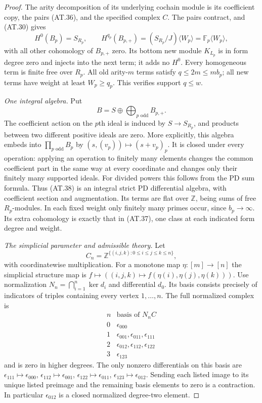 \begin{proof}
The arity decomposition of its underlying cochain
module is its coefficient copy, the pairs
\textup{(AT.36)}, and the specified complex $C$.
The pairs contract, and \textup{(AT.30)} gives
\[
 H^0(B_p)=S_{R_p},\qquad
 H^{q_p}(B_{p,+})=(S_{R_p}/J)\langle W_p\rangle
                   =\mathbb F_p\langle W_p\rangle,
 \tag{AT.37}
\]
with all other cohomology of $B_{p,+}$ zero.
Its bottom new module $K_{L_p}$ is in form degree zero
and injects into the next term; it adds no $H^0$.
Every homogeneous term is finite free over $R_p$.
All old arity-$m$ terms satisfy $q\leq2m\leq m b_p$;
all new terms have weight at least $W_p\geq q_p$.
This verifies support $q\leq w$.

\emph{One integral algebra.}
Put
\[
 B=S\oplus\bigoplus_{p\text{ odd}}B_{p,+}.
 \tag{AT.38}
\]
The coefficient action on the $p$th ideal is induced
by $S\to S_{R_p}$, and products between two different
positive ideals are zero.  More explicitly, this
algebra embeds into $\prod_{p\text{ odd}}B_p$ by
$(s,(v_p))\mapsto(s+v_p)_p$.
It is closed under every operation: applying an
operation to finitely many elements changes the common
coefficient part in the same way at every coordinate
and changes only their finitely many supported ideals.
For divided powers this follows from the PD sum formula.
Thus \textup{(AT.38)} is an integral strict PD differential
algebra, with coefficient section and augmentation.
Its terms are flat over $\mathbb Z$, being sums of
free $R_p$-modules.  In each fixed weight only finitely
many primes occur, since $b_p\to\infty$.
Its extra cohomology is exactly that in
\textup{(AT.37)}, one class at each indicated
form degree and weight.

\emph{The simplicial parameter and admissible theory.}
Let
\[
 C_n=\mathbb Z^{\{(i,j,k):0\leq i\leq j\leq k\leq n\}},
 \tag{AT.39}
\]
with coordinatewise multiplication.  For a monotone
map $\eta:[m]\to[n]$ the simplicial structure map is
$f\mapsto((i,j,k)\mapsto f(\eta(i),\eta(j),\eta(k)))$.
Use normalization $N_n=\bigcap_{i=1}^n\ker d_i$ and
differential $d_0$.  Its basis consists precisely of
indicators of triples containing every vertex
$1,\ldots,n$.  The full normalized complex is
\[
\begin{array}{c|c}
 n&\text{basis of }N_nC\\\hline
0&\epsilon_{000}\\
1&\epsilon_{001},\epsilon_{011},\epsilon_{111}\\
2&\epsilon_{012},\epsilon_{112},\epsilon_{122}\\
3&\epsilon_{123}
\end{array}
\]
and is zero in higher degrees.  The only nonzero
differentials on this basis are
$\epsilon_{111}\mapsto\epsilon_{000}$,
$\epsilon_{112}\mapsto\epsilon_{001}$,
$\epsilon_{122}\mapsto\epsilon_{011}$,
$\epsilon_{123}\mapsto\epsilon_{012}$.
Sending each listed image to its unique listed
preimage and the remaining basis elements to zero
is a contraction.  In particular $\epsilon_{012}$
is a closed normalized degree-two element.


\end{proof}
